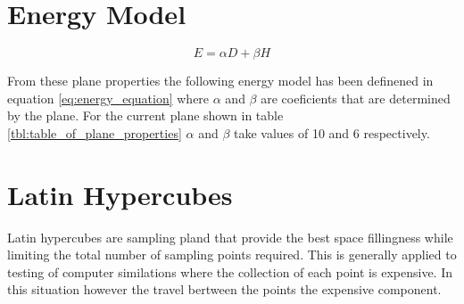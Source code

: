 \documentclass[a4paper,12pt,twoside]{article}
\begin{document}
\section{Energy Model}
\label{sec:energy_model}

\begin{equation}
\label{eq:energy_equation}
E=\alpha D + \beta H
\end{equation}

From these plane properties the following energy model has been definened in equation \ref{eq:energy_equation} where $\alpha$ and $\beta$ are coeficients that are determined by the plane. For the current plane shown in table \ref{tbl:table_of_plane_properties} $\alpha$ and $\beta$ take values of 10 and 6 respectively.

\section{Latin Hypercubes}
\label{sec:latin_hypercubes}

Latin hypercubes are sampling pland that provide the best space fillingness while limiting the total number of sampling points required. This is generally applied to testing of computer similations where the collection of each point is expensive. In this situation however the travel bertween the points the expensive component.
\end{document}
